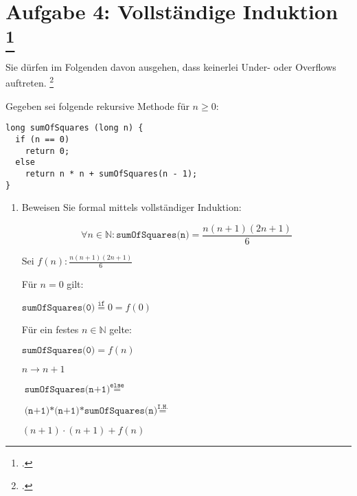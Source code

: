 \documentclass{lehramt-informatik-aufgabe}
\begin{document}
\section{Aufgabe 4: Vollständige Induktion
\footcite{sosy:ab:8}
}

Sie dürfen im Folgenden davon ausgehen, dass keinerlei Under- oder
Overflows auftreten.
\footcite[Thema 1 Aufgabe 4]{examen:66115:2017:03}

\noindent
Gegeben sei folgende rekursive Methode für $n \geq 0$:

\begin{verbatim}
long sumOfSquares (long n) {
  if (n == 0)
    return 0;
  else
    return n * n + sumOfSquares(n - 1);
}
\end{verbatim}

\begin{enumerate}


\item Beweisen Sie formal mittels vollständiger Induktion:

\begin{displaymath}
\forall n \in \mathbb{N} : \texttt{sumOfSquares(n)} =
\frac{n(n + 1)(2n + 1)}{6}
\end{displaymath}

\begin{antwort}
Sei $f(n): \frac{n(n + 1)(2n + 1)}{6}$

%


Für $n = 0$ gilt:

$\texttt{sumOfSquares(0)} \overset{\texttt{if}}{=} 0 = f(0)$

%


Für ein festes $n \in \mathbb{N}$ gelte:

$\texttt{sumOfSquares(0)} = f(n)$

%



$n \rightarrow n + 1$

$\texttt{sumOfSquares(n+1)} \overset{\texttt{else}}{=}$

$\texttt{(n+1)*(n+1)*sumOfSquares(n)} \overset{\texttt{I.H.}}{=}$

$(n + 1) \cdot (n + 1) + f(n)$


\end{antwort}
\end{enumerate}
\end{document}
